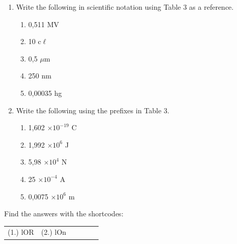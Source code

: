       \label{m30853*id66490}\begin{enumerate}[noitemsep, label=\textbf{\arabic*}. ] 
            \label{m30853*uid39}\item Write the following in scientific notation using Table 3 as a reference.
\label{m30853*id66510}\begin{enumerate}[noitemsep, label=\textbf{\alph*}. ] 
            \label{m30853*uid40}\item 0,511 MV
\label{m30853*uid41}\item 10 c\begin{math}\ell \end{math}\label{m30853*uid42}\item 0,5 \begin{math}\mu \end{math}m
\label{m30853*uid43}\item 250 nm
\label{m30853*uid44}\item 0,00035 hg
\end{enumerate}
                \label{m30853*uid45}\item Write the following using the prefixes in Table 3.
\label{m30853*id66609}\begin{enumerate}[noitemsep, label=\textbf{\alph*}. ] 
            \label{m30853*uid46}\item 1,602 \begin{math}\ensuremath{\times}{10}^{-19}\end{math} C
\label{m30853*uid47}\item 1,992 \begin{math}\ensuremath{\times}{10}^{6}\end{math} J
\label{m30853*uid48}\item 5,98 \begin{math}\ensuremath{\times}{10}^{4}\end{math} N
\label{m30853*uid49}\item 25 \begin{math}\ensuremath{\times}{10}^{-4}\end{math} A
\label{m30853*uid50}\item 0,0075 \begin{math}\ensuremath{\times}{10}^{6}\end{math} m
\end{enumerate}
                \end{enumerate}
        
      

    
\par {} Find the answers with the shortcodes:
 \par \begin{tabular}[h]{cccccc}
 (1.) lOR  &  (2.) lOn  & \end{tabular}




